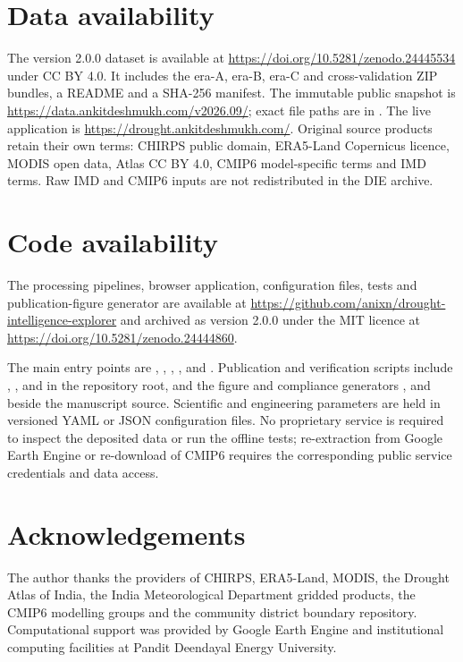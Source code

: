 \documentclass[10pt,a4paper]{article}
\begin{document}
\section*{Data availability}
The version 2.0.0 dataset is available at \url{https://doi.org/10.5281/zenodo.24445534}\citep{DeshmukhData2026} under CC BY 4.0. It includes the era-A, era-B, era-C and cross-validation ZIP bundles, a README and a SHA-256 manifest. The immutable public snapshot is \url{https://data.ankitdeshmukh.com/v2026.09/}; exact file paths are in . The live application is \url{https://drought.ankitdeshmukh.com/}. Original source products retain their own terms: CHIRPS public domain, ERA5-Land Copernicus licence, MODIS open data, Atlas CC BY 4.0, CMIP6 model-specific terms and IMD terms. Raw IMD and CMIP6 inputs are not redistributed in the DIE archive.

\section*{Code availability}
The processing pipelines, browser application, configuration files, tests and publication-figure generator are available at \url{https://github.com/anixn/drought-intelligence-explorer} and archived as version 2.0.0 under the MIT licence at \url{https://doi.org/10.5281/zenodo.24444860}\citep{DeshmukhSoftware2026}.

The main entry points are , , , ,  and . Publication and verification scripts include , ,  and  in the repository root, and the figure and compliance generators ,  and  beside the manuscript source. Scientific and engineering parameters are held in versioned YAML or JSON configuration files. No proprietary service is required to inspect the deposited data or run the offline tests; re-extraction from Google Earth Engine or re-download of CMIP6 requires the corresponding public service credentials and data access.

\section*{Acknowledgements}
The author thanks the providers of CHIRPS, ERA5-Land, MODIS, the Drought Atlas of India, the India Meteorological Department gridded products, the CMIP6 modelling groups and the community district boundary repository. Computational support was provided by Google Earth Engine and institutional computing facilities at Pandit Deendayal Energy University.
\end{document}
